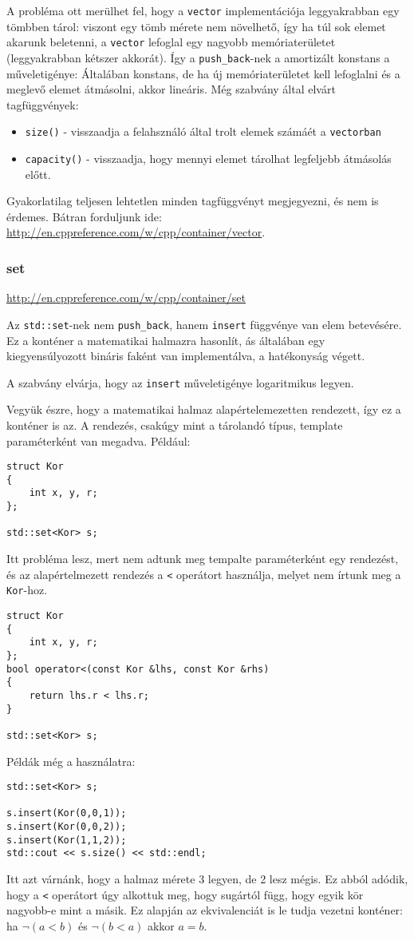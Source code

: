 \documentclass[a4paper,11.5pt]{article}
\begin{document}
	A probléma ott merülhet fel, hogy a \texttt{vector} implementációja leggyakrabban egy tömbben tárol: viszont egy tömb mérete nem növelhető, így ha túl sok elemet akarunk beletenni, a \texttt{vector} lefoglal egy nagyobb memóriaterületet (leggyakrabban kétszer akkorát). Így a \texttt{push\_back}-nek a amortizált konstans a műveletigénye: Általában konstans, de ha új memóriaterületet kell lefoglalni és a meglevő elemet átmásolni, akkor lineáris.
%	
	\smallskip
	Még szabvány által elvárt tagfüggvények:
	\begin{itemize}
		\item \texttt{size()} - visszaadja a felahsználó által trolt elemek számáét a \texttt{vectorban}
		\item \texttt{capacity()} - visszaadja, hogy mennyi elemet tárolhat legfeljebb átmásolás előtt.
	\end{itemize}
	Gyakorlatilag teljesen lehtetlen minden tagfüggvényt megjegyezni, és nem is érdemes. Bátran forduljunk ide: \url{http://en.cppreference.com/w/cpp/container/vector}.
	\subsubsection{set}
	\url{http://en.cppreference.com/w/cpp/container/set}
	
	\smallskip
	Az \texttt{std::set}-nek nem \texttt{push\_back}, hanem \texttt{insert} függvénye van elem betevésére. Ez a konténer a matematikai halmazra hasonlít, ás általában egy kiegyensúlyozott bináris faként van implementálva, a hatékonyság végett.
	\begin{note}
		A szabvány elvárja, hogy az \texttt{insert} műveletigénye logaritmikus legyen.
	\end{note}
	Vegyük észre, hogy a matematikai halmaz alapértelemezetten rendezett, így ez a konténer is az. A rendezés, csakúgy mint a tárolandó típus, template paraméterként van megadva. Például:
	\begin{lstlisting}
struct Kor
{
	int x, y, r;
};

std::set<Kor> s;
	\end{lstlisting}
	Itt probléma lesz, mert nem adtunk meg tempalte paraméterként egy rendezést, és az alapértelmezett rendezés a \texttt{<} operátort használja, melyet nem írtunk meg a \texttt{Kor}-hoz.
	\begin{lstlisting}
struct Kor
{
	int x, y, r;
};
bool operator<(const Kor &lhs, const Kor &rhs)
{
	return lhs.r < lhs.r;
}

std::set<Kor> s;
	\end{lstlisting}
	Példák még a használatra:
\begin{lstlisting}
std::set<Kor> s;

s.insert(Kor(0,0,1));
s.insert(Kor(0,0,2));
s.insert(Kor(1,1,2));
std::cout << s.size() << std::endl;
\end{lstlisting}
	Itt azt várnánk, hogy a halmaz mérete 3 legyen, de 2 lesz mégis. Ez abból adódik, hogy a \texttt{<} operátort úgy alkottuk meg, hogy sugártól függ, hogy egyik kör nagyobb-e mint a másik. Ez alapján az ekvivalenciát is le tudja vezetni konténer: ha $\neg(a<b)$ és $\neg(b<a)$ akkor $a=b$.
\end{document}
